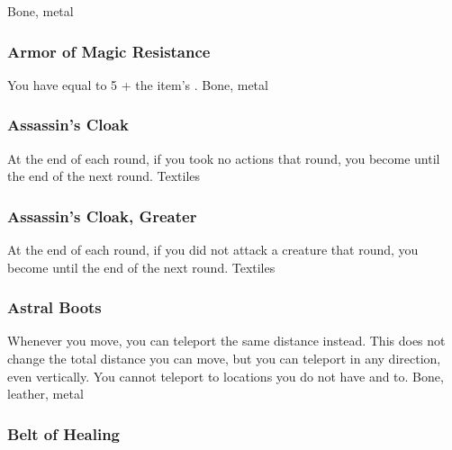 Bone, metal
\lowercase{\hypertarget{item:Armor of Magic Resistance}{}}\label{item:Armor of Magic Resistance}
\hypertarget{item:Armor of Magic Resistance}{\subsubsection{Armor of Magic Resistance\hfill{}}}
You have  equal to 5 + the item's .
 
 Bone, metal
\lowercase{\hypertarget{item:Assassin's Cloak}{}}\label{item:Assassin's Cloak}
\hypertarget{item:Assassin's Cloak}{\subsubsection{Assassin's Cloak\hfill{}}}
At the end of each round, if you took no actions that round, you become  until the end of the next round.
 
 Textiles
\lowercase{\hypertarget{item:Assassin's Cloak, Greater}{}}\label{item:Assassin's Cloak, Greater}
\hypertarget{item:Assassin's Cloak, Greater}{\subsubsection{Assassin's Cloak, Greater\hfill{}}}
At the end of each round, if you did not attack a creature that round, you become  until the end of the next round.
 
 Textiles
\lowercase{\hypertarget{item:Astral Boots}{}}\label{item:Astral Boots}
\hypertarget{item:Astral Boots}{\subsubsection{Astral Boots\hfill{}}}
Whenever you move, you can teleport the same distance instead.
This does not change the total distance you can move, but you can teleport in any direction, even vertically.
You cannot teleport to locations you do not have  and  to.
 
 Bone, leather, metal
\lowercase{\hypertarget{item:Belt of Healing}{}}\label{item:Belt of Healing}
\hypertarget{item:Belt of Healing}{\subsubsection{Belt of Healing\hfill{}}}
